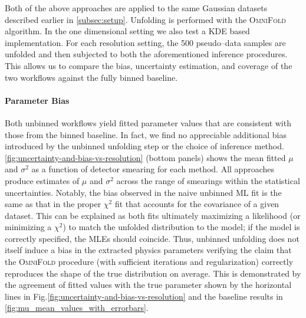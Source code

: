         Both of the above approaches are applied to the same Gaussian datasets described earlier in \cref{subsec:setup}.
        Unfolding is performed with the \textsc{OmniFold} algorithm.
        In the one dimensional setting we also test a KDE based implementation.
        For each resolution setting, the 500 pseudo--data samples are unfolded and then subjected to both the aforementioned inference procedures.
        This allows us to compare the bias, uncertainty estimation, and coverage of the two workflows against the fully binned baseline.
        \paragraph{Parameter Bias}
            Both unbinned workflows yield fitted parameter values that are consistent with those from the binned baseline.
            In fact, we find no appreciable additional bias introduced by the unbinned unfolding step or the choice of inference method.
            \cref{fig:uncertainty-and-bias-vs-resolution} (bottom panels) shows the mean fitted $\mu$ and $\sigma^2$ as a function of detector smearing for each method.
            All approaches produce estimates of $\mu$ and $\sigma^2$ across the range of smearings within the statistical uncertainties.
            Notably, the bias observed in the naive unbinned ML fit is the same as that in the proper $\chi^2$ fit that accounts for the covariance of a given dataset. 
            This can be explained as both fits ultimately maximizing a likelihood (or minimizing a $\chi^2$) to match the unfolded distribution to the model;
            if the model is correctly specified, the MLEs should coincide.
            Thus, unbinned unfolding does not itself induce a bias in the extracted physics parameters verifying the claim that the \textsc{OmniFold} procedure (with sufficient iterations and regularization) correctly reproduces the shape of the true distribution on average.
            This is demonstrated by the agreement of fitted values with the true parameter shown by the horizontal lines in Fig.\cref{fig:uncertainty-and-bias-vs-resolution} and the baseline results in \cref{fig:mu_mean_values_with_errorbars}. 
